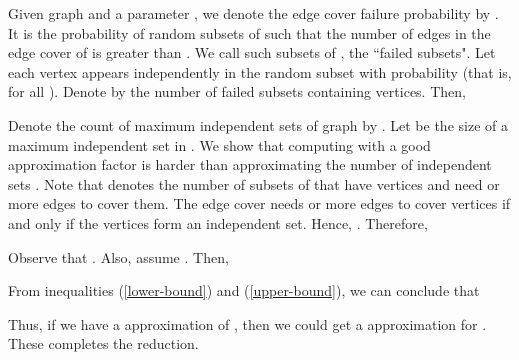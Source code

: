 \documentclass[11pt,onecolumn]{article}
\begin{document}
Given graph  and a parameter , we denote the edge cover failure probability by . It is the probability of random subsets  of  such that the number of edges in the edge cover of  is greater than . We call such subsets of , the ``failed subsets". Let each vertex 
appears independently in the random subset  with probability  (that is,  for all ). 
Denote by  the number of failed subsets containing  vertices. Then,

Denote the count of maximum independent sets of graph  by . 
 Let  be the size of a maximum independent set in .
We show that computing  with a good approximation factor is harder 
than approximating the number of independent sets . Note that  denotes the number of subsets of  that have  vertices and need  or 
more edges to cover them. The edge cover needs  or more edges to cover 
vertices if and only if the  vertices form an independent set. Hence, 
. Therefore,

Observe that . Also, assume 
. Then,

From inequalities (\ref{lower-bound}) and (\ref{upper-bound}), we can conclude that 

Thus, if we have a  approximation of , then we could
get a  approximation for . These completes the reduction.






\end{document}
